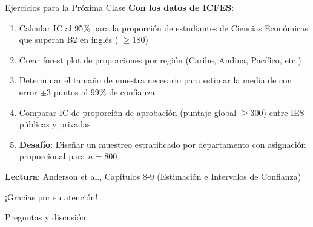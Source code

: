 \documentclass[aspectratio=169, 11pt]{beamer}
\begin{document}
\begin{frame}{Ejercicios para la Próxima Clase}
\textbf{Con los datos de ICFES}:
\begin{enumerate}
  \item Calcular IC al 95\% para la proporción de estudiantes de Ciencias Econ\'omicas que superan B2 en inglés ( $\geq 180$)
  \item Crear forest plot de proporciones por región (Caribe, Andina, Pacífico, etc.)
  \item Determinar el tamaño de muestra necesario para estimar la media de  con error $\pm 3$ puntos al 99\% de confianza
  \item Comparar IC de proporción de aprobación (puntaje global $\geq 300$) entre IES públicas y privadas
  \item \textbf{Desafío}: Diseñar un muestreo estratificado por departamento con asignación proporcional para $n = 800$
\end{enumerate}

\vspace{0.3cm}
\textbf{Lectura}: Anderson et al., Capítulos 8-9 (Estimación e Intervalos de Confianza)
\end{frame}

\begin{frame}
\begin{center}
\Large
¡Gracias por su atención!

\vspace{1cm}
\normalsize
Preguntas y discusión
\end{center}
\end{frame}
\end{document}
